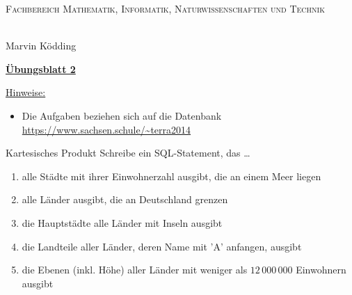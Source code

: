 \documentclass[12pt,a4paper,notitlepage,leqno]{article}
\begin{document}
\vspace{0.2cm}
\begin{minipage}[c]{0.5\textwidth}
\begin{center}
\textsc{Fachbereich Mathematik, Informatik, Naturwissenschaften und Technik}
\end{center}
\end{minipage}
\begin{minipage}[c]{0.5\textwidth}
\begin{center}
\textbf{\thema}\\
Marvin Ködding
\end{center}
\end{minipage}

\begin{center}
\textbf{\underline{Übungsblatt 2}}

\vspace{0.2cm}
\end{center}
\underline{Hinweise:}
\begin{itemize}
\item Die Aufgaben beziehen sich auf die Datenbank \url{https://www.sachsen.schule/~terra2014}
\end{itemize}

\begin{aufgabe}{Kartesisches Produkt}
Schreibe ein SQL-Statement, das \dots
\begin{enumerate}
    \item alle Städte mit ihrer Einwohnerzahl ausgibt, die an einem Meer liegen
    \item alle Länder ausgibt, die an Deutschland grenzen
    \item die Hauptstädte alle Länder mit Inseln ausgibt
    \item die Landteile aller Länder, deren Name mit 'A' anfangen, ausgibt
    \item die Ebenen (inkl. Höhe) aller Länder mit weniger als $12\,000\,000$ Einwohnern ausgibt
\end{enumerate}
\end{aufgabe}
\end{document}
